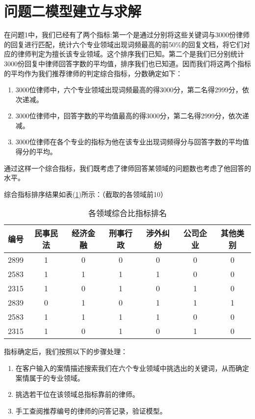 \documentclass[bwprint]{cumcmthesis}
\begin{document}
\section{问题二模型建立与求解}

在问题1中，我们已经有了两个指标:第一个是通过分别将这些关键词与3000份律师的回复进行匹配，统计六个专业领域出现词频最高的前50\%的回复文档，将它们对应的律师判定为擅长该专业领域。这个排序我们已知。第二个是我们已分别统计3000份回复中律师回答字数的平均值，排序我们也已知道。因而我们将这两个指标的平均作为我们推荐律师的判定综合指标，分数确定如下：

\begin{enumerate}
	\item 3000位律师中，六个专业领域出现词频最高的得3000分，第二名得2999分，依次递减。
	\item 3000位律师中，回答字数的平均值最高的得3000分，第二名得2999分，依次递减。
	\item 3000位律师在各个专业的指标为他在该专业出现词频得分与回答字数的平均值得分的平均。
\end{enumerate}

通过这样一个综合指标，我们既考虑了律师回答某领域的问题数也考虑了他回答的水平。

综合指标排序结果如表(\ref{各领域综合比指标排名})所示：（截取的各领域前10）

\begin{table}[!htp]
\center
\caption{各领域综合比指标排名}
\label{各领域综合比指标排名}
    \begin{tabular}{|c|c|c|c|c|c|c|}
    \hline
    编号   & 民事民法 & 经济金融 & 刑事行政 & 涉外纠纷 & 公司企业 & 其他类别 \\ \hline
    2899 & 1    & 0    & 0    & 0    & 0    & 0    \\ \hline
    2583 & 1    & 1    & 1    & 1    & 0    & 0    \\ \hline
    2315 & 1    & 0    & 1    & 0    & 1    & 0    \\ \hline
    2839 & 0    & 1    & 0    & 1    & 1    & 1    \\ \hline
    2583 & 1    & 1    & 1    & 1    & 0    & 0    \\ \hline
    2315 & 1    & 0    & 1    & 0    & 1    & 0    \\ \hline
    \end{tabular}
\end{table}

指标确定后，我们按照以下的步骤处理：

\begin{enumerate}
	\item 在客户输入的案情描述搜索我们在六个专业领域中挑选出的关键词，从而确定案情属于的专业领域。
	\item 挑选若干位在该领域总指标靠前的律师。
	\item 手工查阅推荐编号的律师的问答记录，验证模型。
\end{enumerate}
\end{document}
